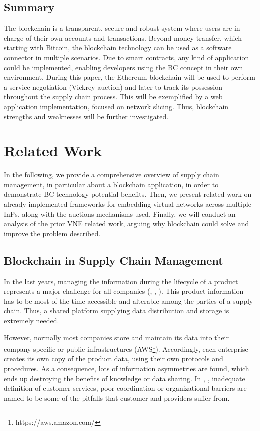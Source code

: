 \section{Summary}

The blockchain is a transparent, secure and robust system where users are in charge of their own accounts and transactions. Beyond money transfer, which starting with Bitcoin, the blockchain technology can be used as a software connector in multiple scenarios. Due to smart contracts, any kind of application could be implemented, enabling developers using the BC concept in their own environment. During this paper, the Ethereum blockchain will be used to perform a service negotiation (Vickrey auction) and later to track its possession throughout the supply chain process. This will be exemplified by a web application implementation, focused on network slicing. Thus, blockchain strengths and weaknesses will be further investigated.

\chapter{Related Work}
\label{ch:relatedwork}

In the following, we provide a comprehensive overview of supply chain management, in particular about a blockchain application, in order to demonstrate BC technology potential benefits. Then, we present related work on already implemented frameworks for embedding virtual networks across multiple InPs, along with the auctions mechanisms used. Finally, we will conduct an analysis of the prior VNE related work, arguing why blockchain could solve and improve the problem described.

\section{Blockchain in Supply Chain Management}

In the last years, managing the information during the lifecycle of a product represents a major challenge for all companies (\citep{karkkainen2003product}, \citep{tuttle2002you}, \citep{karkkainen2002wireless}). This product information has to be most of the time accessible and alterable among the parties of a supply chain. Thus, a shared platform supplying data distribution and storage is extremely needed.

However, normally most companies store and maintain its data into their company-specific or public infrastructures (AWS\footnote{https://aws.amazon.com/}). Accordingly, each enterprise creates its own copy of the product data, using their own protocols and procedures.  As a consequence, lots of information asymmetries are found, which ends up destroying the benefits of knowledge or data sharing. In \citep{lee1992managing}, \citep{fiala2005information},\citep{li2008confidentiality} inadequate definition of customer services, poor coordination or organizational barriers are named to be some of the pitfalls that customer and providers suffer from.


